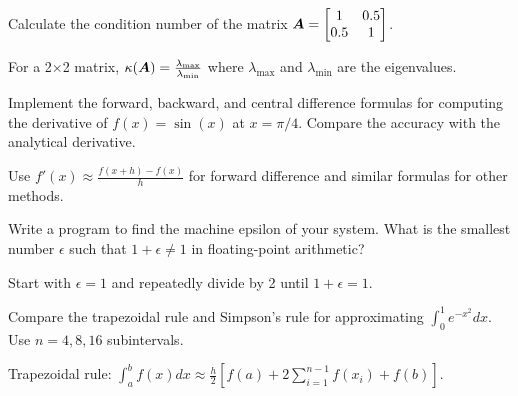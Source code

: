 \begin{exercisebox}[easy]
\begin{problem}
\label{prob:condition-number}
Calculate the condition number of the matrix $\boldsymbol{A} = \begin{bmatrix} 1 & 0.5 \\ 0.5 & 1 \end{bmatrix}$.
\end{problem}
\begin{hintbox}
For a 2×2 matrix, $\kappa(\boldsymbol{A}) = \frac{\lambda_{\max}}{\lambda_{\min}}$ where $\lambda_{\max}$ and $\lambda_{\min}$ are the eigenvalues.
\end{hintbox}
\end{exercisebox}


\begin{exercisebox}[easy]
\begin{problem}
\label{prob:numerical-diff}
Implement the forward, backward, and central difference formulas for computing the derivative of $f(x) = \sin(x)$ at $x = \pi/4$. Compare the accuracy with the analytical derivative.
\end{problem}
\begin{hintbox}
Use $f'(x) \approx \frac{f(x+h) - f(x)}{h}$ for forward difference and similar formulas for other methods.
\end{hintbox}
\end{exercisebox}


\begin{exercisebox}[easy]
\begin{problem}
\label{prob:machine-epsilon}
Write a program to find the machine epsilon of your system. What is the smallest number $\epsilon$ such that $1 + \epsilon \neq 1$ in floating-point arithmetic?
\end{problem}
\begin{hintbox}
Start with $\epsilon = 1$ and repeatedly divide by 2 until $1 + \epsilon = 1$.
\end{hintbox}
\end{exercisebox}


\begin{exercisebox}[easy]
\begin{problem}
\label{prob:numerical-integration}
Compare the trapezoidal rule and Simpson's rule for approximating $\int_0^1 e^{-x^2} dx$. Use $n = 4, 8, 16$ subintervals.
\end{problem}
\begin{hintbox}
Trapezoidal rule: $\int_a^b f(x)dx \approx \frac{h}{2}[f(a) + 2\sum_{i=1}^{n-1}f(x_i) + f(b)]$.
\end{hintbox}
\end{exercisebox}


